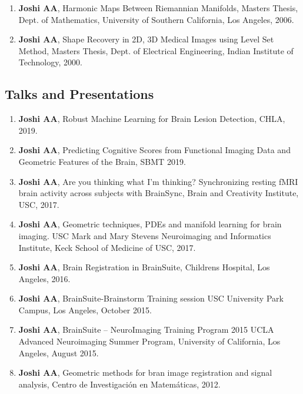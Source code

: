 \documentclass[overlapped,line,letterpaper]{res}
\begin{document}
\begin{resume}
\begin{enumerate}
    \item \textbf{Joshi AA}, Harmonic Maps Between Riemannian Manifolds, Masters Thesis, Dept. of Mathematics, University of Southern California, Los Angeles, 2006.

    \item \textbf{Joshi AA}, Shape Recovery in 2D, 3D Medical Images using Level Set Method, Masters Thesis, Dept. of Electrical Engineering, Indian Institute of Technology, 2000.

\end{enumerate}

\subsection{Talks and Presentations}
\begin{enumerate}

    \item \textbf{Joshi AA}, Robust Machine Learning for Brain Lesion Detection, CHLA, 2019. 

    \item \textbf{Joshi AA}, Predicting Cognitive Scores from Functional Imaging Data and Geometric Features of the Brain, SBMT 2019.

    \item \textbf{Joshi AA}, Are you thinking what I'm thinking? Synchronizing resting fMRI brain activity across subjects with BrainSync, Brain and Creativity Institute, USC, 2017.

    \item \textbf{Joshi AA}, Geometric techniques, PDEs and manifold learning for brain imaging. USC Mark and Mary Stevens
Neuroimaging and Informatics Institute, Keck School of Medicine of USC, 2017.

    \item \textbf{Joshi AA}, Brain Registration in BrainSuite, Childrens Hospital, Los Angeles, 2016.

    \item \textbf{Joshi AA}, BrainSuite-Brainstorm Training session USC University Park Campus, Los Angeles, October 2015.

    \item \textbf{Joshi AA}, BrainSuite – NeuroImaging Training Program 2015 UCLA Advanced Neuroimaging Summer Program, University of California, Los Angeles, August 2015.  

    \item \textbf{Joshi AA}, Geometric methods for bran image registration and signal analysis, Centro de Investigación en Matemáticas, 2012.


\end{enumerate}
\end{resume}
\end{document}
